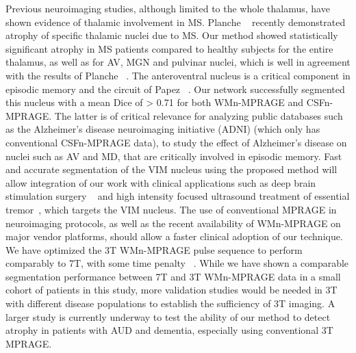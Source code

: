 Previous neuroimaging studies, although limited to the whole thalamus, have shown evidence of thalamic involvement in MS. Planche \unskip~\cite{1643371:26789959} recently demonstrated atrophy of specific thalamic nuclei due to MS. Our method showed statistically significant atrophy in MS patients compared to healthy subjects for the entire thalamus, as well as for AV, MGN and pulvinar nuclei, which is well in agreement with the results of Planche \unskip~\cite{1643371:26789959}. The anteroventral nucleus is a critical component in episodic memory and the circuit of Papez \unskip~\cite{1643371:26789934}. Our network successfully segmented this nucleus with a mean Dice of {\textgreater} 0.71 for both WMn-MPRAGE and CSFn-MPRAGE. The latter is of critical relevance for analyzing public databases such as the Alzheimer's disease neuroimaging initiative (ADNI) (which only has conventional CSFn-MPRAGE data), to study the effect of Alzheimer's disease on nuclei such as AV and MD, that are critically involved in episodic memory. Fast and accurate segmentation of the VIM nucleus using the proposed method will allow integration of our work with clinical applications such as deep brain stimulation surgery \unskip~\cite{1643371:26789937,1643371:26789916,1643371:26789943} and high intensity focused ultrasound treatment of essential tremor\unskip~\cite{1643371:26789906}, which targets the VIM nucleus. The use of conventional MPRAGE in neuroimaging protocols, as well as the recent availability of WMn-MPRAGE on major vendor platforms, should allow a faster clinical adoption of our technique. We have optimized the 3T WMn-MPRAGE pulse sequence to perform comparably to 7T, with some time penalty \unskip~\cite{1643371:26789912}. While we have shown a comparable segmentation performance between 7T and 3T WMn-MPRAGE data in a small cohort of patients in this study, more validation studies would be needed in 3T with different disease populations to establish the sufficiency of 3T imaging. A larger study is currently underway to test the ability of our method to detect atrophy in patients with AUD and dementia, especially using conventional 3T MPRAGE. 

